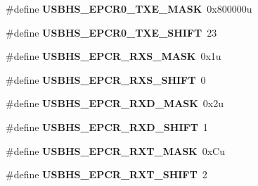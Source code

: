 \begin{DoxyCompactItemize}
\item 
\hypertarget{group___u_s_b_h_s___register___masks_ga83a45997f04ec291de7ccae5e9fbc8a4}{}\#define {\bfseries U\+S\+B\+H\+S\+\_\+\+E\+P\+C\+R0\+\_\+\+T\+X\+E\+\_\+\+M\+A\+S\+K}~0x800000u\label{group___u_s_b_h_s___register___masks_ga83a45997f04ec291de7ccae5e9fbc8a4}

\item 
\hypertarget{group___u_s_b_h_s___register___masks_gae17f381c45cd02973a8438ea22413e51}{}\#define {\bfseries U\+S\+B\+H\+S\+\_\+\+E\+P\+C\+R0\+\_\+\+T\+X\+E\+\_\+\+S\+H\+I\+F\+T}~23\label{group___u_s_b_h_s___register___masks_gae17f381c45cd02973a8438ea22413e51}

\item 
\hypertarget{group___u_s_b_h_s___register___masks_gac611faeeae8ccac3776c749064add355}{}\#define {\bfseries U\+S\+B\+H\+S\+\_\+\+E\+P\+C\+R\+\_\+\+R\+X\+S\+\_\+\+M\+A\+S\+K}~0x1u\label{group___u_s_b_h_s___register___masks_gac611faeeae8ccac3776c749064add355}

\item 
\hypertarget{group___u_s_b_h_s___register___masks_ga6c41de52778762ea901d471767313132}{}\#define {\bfseries U\+S\+B\+H\+S\+\_\+\+E\+P\+C\+R\+\_\+\+R\+X\+S\+\_\+\+S\+H\+I\+F\+T}~0\label{group___u_s_b_h_s___register___masks_ga6c41de52778762ea901d471767313132}

\item 
\hypertarget{group___u_s_b_h_s___register___masks_gaf432998d21e7e8845c895a23d90278a9}{}\#define {\bfseries U\+S\+B\+H\+S\+\_\+\+E\+P\+C\+R\+\_\+\+R\+X\+D\+\_\+\+M\+A\+S\+K}~0x2u\label{group___u_s_b_h_s___register___masks_gaf432998d21e7e8845c895a23d90278a9}

\item 
\hypertarget{group___u_s_b_h_s___register___masks_ga5128f07759371b5a2330d973a43ed839}{}\#define {\bfseries U\+S\+B\+H\+S\+\_\+\+E\+P\+C\+R\+\_\+\+R\+X\+D\+\_\+\+S\+H\+I\+F\+T}~1\label{group___u_s_b_h_s___register___masks_ga5128f07759371b5a2330d973a43ed839}

\item 
\hypertarget{group___u_s_b_h_s___register___masks_ga6c1509fda3abee1b550e1204bb67fdbf}{}\#define {\bfseries U\+S\+B\+H\+S\+\_\+\+E\+P\+C\+R\+\_\+\+R\+X\+T\+\_\+\+M\+A\+S\+K}~0x\+Cu\label{group___u_s_b_h_s___register___masks_ga6c1509fda3abee1b550e1204bb67fdbf}

\item 
\hypertarget{group___u_s_b_h_s___register___masks_ga11f41b319be8ce44d2fa7661f9864e5b}{}\#define {\bfseries U\+S\+B\+H\+S\+\_\+\+E\+P\+C\+R\+\_\+\+R\+X\+T\+\_\+\+S\+H\+I\+F\+T}~2\label{group___u_s_b_h_s___register___masks_ga11f41b319be8ce44d2fa7661f9864e5b}


\end{DoxyCompactItemize}

